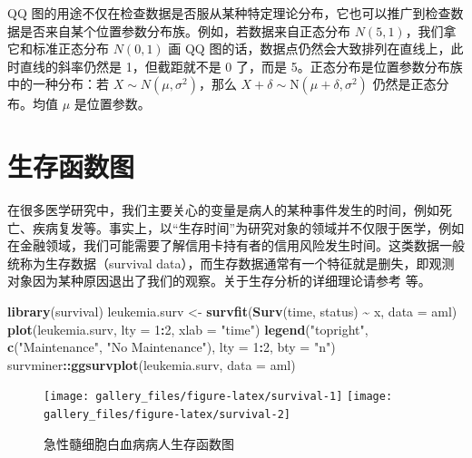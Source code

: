\documentclass[
  b5paper,
  UTF8,twoside]{book}
\newenvironment{Shaded}{\begin{snugshade}}{\end{snugshade}}
\newcommand{\AttributeTok}[1]{\textcolor[rgb]{0.13,0.29,0.53}{#1}}
\newcommand{\DecValTok}[1]{\textcolor[rgb]{0.00,0.00,0.81}{#1}}
\newcommand{\FunctionTok}[1]{\textcolor[rgb]{0.13,0.29,0.53}{\textbf{#1}}}
\newcommand{\NormalTok}[1]{#1}
\newcommand{\OtherTok}[1]{\textcolor[rgb]{0.56,0.35,0.01}{#1}}
\newcommand{\SpecialCharTok}[1]{\textcolor[rgb]{0.81,0.36,0.00}{\textbf{#1}}}
\newcommand{\StringTok}[1]{\textcolor[rgb]{0.31,0.60,0.02}{#1}}
\begin{document}
QQ 图的用途不仅在检查数据是否服从某种特定理论分布，它也可以推广到检查数据是否来自某个位置参数分布族。例如，若数据来自正态分布 \(N(5,1)\)，我们拿它和标准正态分布 \(N(0,1)\) 画 QQ 图的话，数据点仍然会大致排列在直线上，此时直线的斜率仍然是 1，但截距就不是 0 了，而是 5。正态分布是位置参数分布族中的一种分布：若 \(X\sim N(\mu,\sigma^{2})\)，那么 \(X + \delta \sim \mathrm{N}(\mu+\delta,\sigma^{2})\) 仍然是正态分布。均值 \(\mu\) 是位置参数。

\section{生存函数图}\label{ux751fux5b58ux51fdux6570ux56fe}

在很多医学研究中，我们主要关心的变量是病人的某种事件发生的时间，例如死亡、疾病复发等。事实上，以``生存时间''为研究对象的领域并不仅限于医学，例如在金融领域，我们可能需要了解信用卡持有者的信用风险发生时间。这类数据一般统称为生存数据（survival data），而生存数据通常有一个特征就是删失，即观测对象因为某种原因退出了我们的观察。关于生存分析的详细理论请参考 \citet{Therneau00} 等。





\begin{Shaded}
\begin{Highlighting}[]
\FunctionTok{library}\NormalTok{(survival)}
\NormalTok{leukemia.surv }\OtherTok{\textless{}{-}} \FunctionTok{survfit}\NormalTok{(}\FunctionTok{Surv}\NormalTok{(time, status) }\SpecialCharTok{\textasciitilde{}}\NormalTok{ x, }\AttributeTok{data =}\NormalTok{ aml)}
\FunctionTok{plot}\NormalTok{(leukemia.surv, }\AttributeTok{lty =} \DecValTok{1}\SpecialCharTok{:}\DecValTok{2}\NormalTok{, }\AttributeTok{xlab =} \StringTok{"time"}\NormalTok{)}
\FunctionTok{legend}\NormalTok{(}\StringTok{"topright"}\NormalTok{, }\FunctionTok{c}\NormalTok{(}\StringTok{"Maintenance"}\NormalTok{, }\StringTok{"No Maintenance"}\NormalTok{), }\AttributeTok{lty =} \DecValTok{1}\SpecialCharTok{:}\DecValTok{2}\NormalTok{, }\AttributeTok{bty =} \StringTok{"n"}\NormalTok{)}
\NormalTok{survminer}\SpecialCharTok{::}\FunctionTok{ggsurvplot}\NormalTok{(leukemia.surv, }\AttributeTok{data =}\NormalTok{ aml)}
\end{Highlighting}
\end{Shaded}

\begin{figure}

{\centering \texttt{[image: gallery\_files/figure-latex/survival-1]} \texttt{[image: gallery\_files/figure-latex/survival-2]} 

}

\caption[急性髓细胞白血病病人生存函数图]{急性髓细胞白血病病人生存函数图}\label{fig:survival}
\end{figure}
\end{document}

